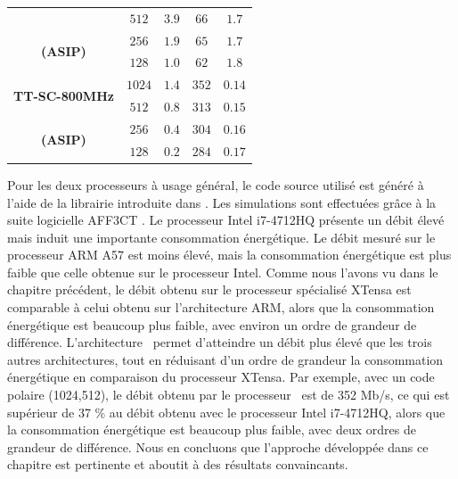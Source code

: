 \begin{table}
\begin{tabular}{ccccc}
                                                & $512$    & $3.9$  & $66$  & $1.7$ \\

     \multirow{2}{*}{\bf (ASIP)}                & $256$    & $1.9$  & $65$  & $1.7$ \\

                                                & $128$    & $1.0$  & $62$  & $1.8$ \\

    \midrule

    \multirow{2}{*}{\bf TT-SC-800MHz}            & $1024$  & $1.4$   & $352$ & $0.14$   \\ %

                                                & $512$    & $0.8$  & $313$ & $0.15$   \\ %

     \multirow{2}{*}{\bf (ASIP)}                & $256$    & $0.4$  & $304$ & $0.16$   \\ %

                                                & $128$    & $0.2$  & $284$ & $0.17$   \\ %

    \bottomrule
  \end{tabular}
\end{table}

Pour les deux processeurs à usage général, le code source utilisé est généré à l'aide de la librairie introduite dans \cite{cassagne_efficient_2015}. Les simulations sont effectuées grâce à la suite logicielle AFF3CT \cite{aff3ct_aff3ct:_2016}. Le processeur Intel i7-4712HQ présente un débit élevé mais induit une importante consommation énergétique. Le débit mesuré sur le processeur ARM A57 est moins élevé, mais la consommation énergétique est plus faible que celle obtenue sur le processeur Intel. Comme nous l'avons vu dans le chapitre précédent, le débit obtenu sur le processeur spécialisé XTensa est comparable à celui obtenu sur l'architecture ARM, alors que la consommation énergétique est beaucoup plus faible, avec environ un ordre de grandeur de différence. L'architecture \TTSC~permet d'atteindre un débit plus élevé que les trois autres architectures, tout en réduisant d'un ordre de grandeur la consommation énergétique en comparaison du processeur XTensa. Par exemple, avec un code polaire (1024,512), le débit obtenu par le processeur \TTSC~est de 352 Mb/s, ce qui est supérieur de 37 \% au débit obtenu avec le processeur Intel i7-4712HQ, alors que la consommation énergétique est beaucoup plus faible, avec deux ordres de grandeur de différence. Nous en concluons que l'approche développée dans ce chapitre est pertinente et aboutit à des résultats convaincants.

